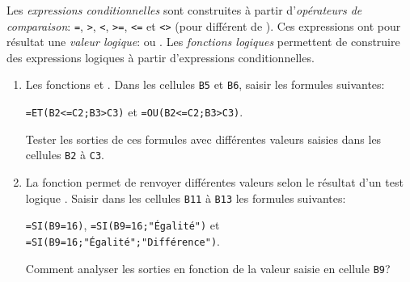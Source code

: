 \documentclass[a4paper, twoside, 11pt]{article}
\begin{document}
\begin{exercise}
  Les \emph{expressions conditionnelles} sont construites à partir d'\emph{opérateurs de comparaison}: \verb+=+, \verb+>+, \verb+<+, \verb+>=+, \verb+<=+ et \verb+<>+ (pour \og différent de \fg). Ces expressions ont pour résultat une \emph{valeur logique}:  ou . Les \emph{fonctions logiques} permettent de construire des expressions logiques à partir d'expressions conditionnelles.
  \begin{enumerate}
    \item Les fonctions  et . Dans les cellules \verb+B5+ et \verb+B6+, saisir les formules suivantes:
    \begin{center}
      \verb+=ET(B2<=C2;B3>C3)+ \quad et \quad \verb+=OU(B2<=C2;B3>C3)+.
    \end{center}
    Tester les sorties de ces formules avec différentes valeurs saisies dans les cellules \verb+B2+ à \verb+C3+.
    \item La fonction  permet de renvoyer différentes valeurs selon le résultat d'un \og test logique \fg. Saisir dans les cellules \verb+B11+ à \verb+B13+ les formules suivantes:
    \begin{center}
      \verb+=SI(B9=16)+, \quad \verb+=SI(B9=16;"Égalité")+ \quad et \quad \verb+=SI(B9=16;"Égalité";"Différence")+.
    \end{center}
    Comment analyser les sorties en fonction de la valeur saisie en cellule \verb+B9+?
  \end{enumerate}
\end{exercise}
\end{document}
